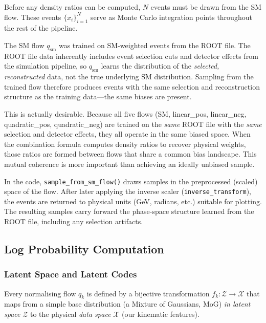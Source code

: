 \documentclass[11pt,a4paper]{article}
\begin{document}
Before any density ratios can be computed, $N$ events must be drawn from the SM flow.  These events
$\{x_i\}_{i=1}^N$ serve as Monte Carlo integration points throughout the rest of the pipeline.

The SM flow $q_{\text{sm}}$ was trained on SM-weighted events from the ROOT file.  The ROOT file 
data inherently includes event selection cuts and detector effects from the simulation pipeline, 
so $q_{\text{sm}}$ learns the distribution of the \emph{selected, reconstructed} data, not the true 
underlying SM distribution.  Sampling from the trained flow therefore produces events with the same 
selection and reconstruction structure as the training data---the same biases are present.

This is actually desirable.  Because all five flows (SM, linear\_pos, linear\_neg, quadratic\_pos, 
quadratic\_neg) are trained on the \emph{same} ROOT file with the \emph{same} selection and detector 
effects, they all operate in the same biased space.  When the combination formula computes density 
ratios to recover physical weights, those ratios are formed between flows that share a common 
bias landscape.  This mutual coherence is more important than achieving an ideally unbiased sample.

In the code, \texttt{sample\_from\_sm\_flow()} draws samples in the preprocessed (scaled) space of
the flow.  After later applying the inverse scaler (\texttt{inverse\_transform}), the events are
returned to physical units (GeV, radians, etc.) suitable for plotting.  The resulting samples carry 
forward the phase-space structure learned from the ROOT file, including any selection artifacts.

\subsection{Log Probability Computation}

\label{sec:logp}

\subsubsection{Latent Space and Latent Codes}

Every normalising flow $q_k$ is defined by a bijective transformation $f_k: \mathcal{Z} \to \mathcal{X}$ that 
maps from a simple base distribution (a Mixture of Gaussians, MoG) \emph{in latent space} $\mathcal{Z}$ to the 
physical \emph{data space} $\mathcal{X}$ (our kinematic features).  
\end{document}

